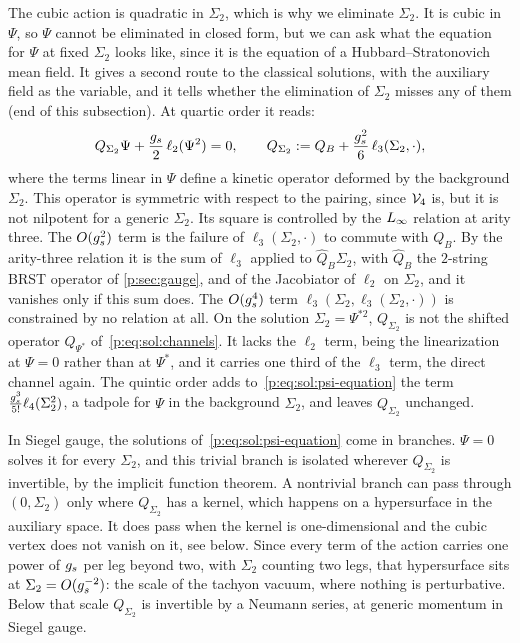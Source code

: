 The cubic action is quadratic in $\Sigma_2$, which is why we eliminate $\Sigma_2$.
It is cubic in $\Psi$, so $\Psi$ cannot be eliminated in closed form, but we can ask what the equation for $\Psi$ at fixed $\Sigma_2$ looks like, since it is the equation of a Hubbard--Stratonovich mean field.
It gives a second route to the classical solutions, with the auxiliary field as the variable, and it tells whether the elimination of $\Sigma_2$ misses any of them (end of this subsection).
At quartic order it reads:
\begin{equation}
  \label{p:eq:sol:psi-equation}
  Q_{\Sigma_2} \Psi
    + \frac{g_s}{2} \, \ell_2(\Psi^2)
    = 0,
  \qquad
  Q_{\Sigma_2}
    := Q_B + \frac{g_s^2}{6} \, \ell_3(\Sigma_2, \cdot),
\end{equation}
where the terms linear in $\Psi$ define a kinetic operator deformed by the background $\Sigma_2$.
This operator is symmetric with respect to the pairing, since $\mathcal{V}_{4}$ is, but it is not nilpotent for a generic $\Sigma_2$.
Its square is controlled by the $L_\infty$ relation at arity three.
The $O(g_s^2)$ term is the failure of $\ell_3(\Sigma_2, \cdot)$ to commute with $Q_B$.
By the arity-three relation it is the sum of $\ell_3$ applied to $\hat Q_B \Sigma_2$, with $\hat Q_B$ the $2$-string BRST operator of \cref{p:sec:gauge}, and of the Jacobiator of $\ell_2$ on $\Sigma_2$, and it vanishes only if this sum does.
The $O(g_s^4)$ term $\ell_3(\Sigma_2, \ell_3(\Sigma_2, \cdot))$ is constrained by no relation at all.
On the solution $\Sigma_2 = \Psi^{* 2}$, $Q_{\Sigma_2}$ is not the shifted operator $Q_{\Psi^*}$ of~\eqref{p:eq:sol:channels}.
It lacks the $\ell_2$ term, being the linearization at $\Psi = 0$ rather than at $\Psi^*$, and it carries one third of the $\ell_3$ term, the direct channel again.
The quintic order adds to~\eqref{p:eq:sol:psi-equation} the term $\tfrac{g_s^3}{5!} \ell_4(\Sigma_2^2)$, a tadpole for $\Psi$ in the background $\Sigma_2$, and leaves $Q_{\Sigma_2}$ unchanged.

In Siegel gauge, the solutions of~\eqref{p:eq:sol:psi-equation} come in branches.
$\Psi = 0$ solves it for every $\Sigma_2$, and this trivial branch is isolated wherever $Q_{\Sigma_2}$ is invertible, by the implicit function theorem.
A nontrivial branch can pass through $(0, \Sigma_2)$ only where $Q_{\Sigma_2}$ has a kernel, which happens on a hypersurface in the auxiliary space.
It does pass when the kernel is one-dimensional and the cubic vertex does not vanish on it, see below.
Since every term of the action carries one power of $g_s$ per leg beyond two, with $\Sigma_2$ counting two legs, that hypersurface sits at $\Sigma_2 = O(g_s^{-2})$: the scale of the tachyon vacuum, where nothing is perturbative.
Below that scale $Q_{\Sigma_2}$ is invertible by a Neumann series, at generic momentum in Siegel gauge.

